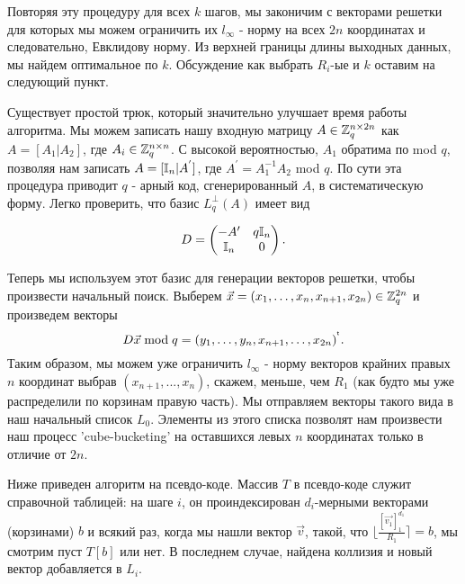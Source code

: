 \documentclass[a4paper,11pt]{article}
\begin{document}
Повторяя эту процедуру для всех $k$ шагов, мы законичим с векторами решетки для которых мы можем ограничить их $l_{\infty}$ - норму на всех $2n$ координатах и следовательно, Евклидову норму. Из верхней границы длины выходных данных, мы найдем оптимальное по $k$. Обсуждение как выбрать $R_i$-ые и $k$ оставим на следующий пункт.

Существует простой трюк, который значительно улучшает время работы алгоритма. Мы можем записать нашу входную матрицу $A \in {{\mathbb Z}}_q^{n \times 2n}$ как $A = [A_1 | A_2]$, где $A_i \in {{\mathbb Z}}_q^{n \times n}$. С высокой вероятностью, $A_1$ обратима по mod $q$, позволяя нам записать $A = [\mathbb{I}_n | A^{'}]$, где $A^{'} = A^{-1}_1 A_2$ mod $q$. По сути эта процедура приводит $q$ - арный код, сгенерированный $A$, в систематическую форму. Легко проверить, что базис $L^{\perp}_q (A)$ имеет вид 
\begin{center}
\begin{equation} \label{eq:BasisD}
	D = \begin{pmatrix}
	-A' & q\mathbb{I}_n \\
	\mathbb{I}_{n} & 0
	\end{pmatrix}.
\end{equation}
\end{center}

Теперь мы используем этот базис для генерации векторов решетки, чтобы произвести начальный поиск. Выберем $\vec{x}  = (x_1, \ldots, x_n, x_{n+1}, x_{2n}) \in {{\mathbb Z}}_q^{2n}$ и произведем векторы
\[
D \vec{x} \bmod q = (y_1,  \ldots,  y_n,  x_{n+1}, \ldots, x_{2n})^{\mkern0.1mu^{\mathsf{t}}}.
\]
Таким образом, мы можем уже ограничить $l_{\infty}$ - норму векторов крайних правых $n$ координат выбрав $(x_{n+1},...,x_n)$, скажем, меньше, чем $R_1$ (как будто мы уже распределили по корзинам правую часть). Мы отправляем векторы такого вида в наш начальный список $L_0$. Элементы из этого списка позволят нам произвести наш процесс 'cube-bucketing' на оставшихся левых $n$ координатах только в отличие от $2n$.

Ниже приведен алгоритм на псевдо-коде. Массив $T$ в псевдо-коде служит справочной таблицей: на шаге $i$, он проиндексирован $d_i$-мерными векторами (корзинами) $b$ и всякий раз, когда мы нашли вектор $\vec{v}$, такой, что $\Big\lfloor \frac{[\vec{v_1}]_1^{d_1}}{R_1} \Big\rceil = b$, мы смотрим пуст $T[b]$ или нет. В последнем случае, найдена коллизия и новый вектор добавляется в $L_i$.
\end{document}
